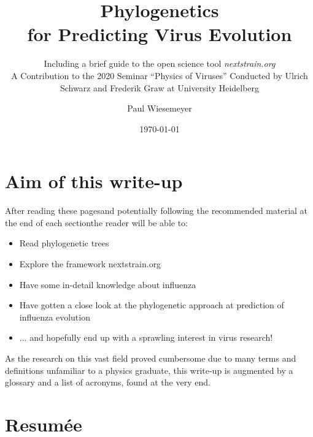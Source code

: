 \documentclass[12pt]{scrartcl}
\author{Paul Wiesemeyer}
\title{Phylogenetics\texorpdfstring{\\}{,} for Predicting Virus Evolution}
\subtitle{Including a brief guide to the open science tool {\LARGE\textit{nextstrain.org}} \texorpdfstring{\\[1cm]}{,}A Contribution to the 2020 Seminar ``Physics of Viruses'' Conducted by Ulrich Schwarz and Frederik Graw at University Heidelberg }
\date{\today}
\begin{document}
\maketitle

\clearpage

\section*{Aim of this write-up}

  After reading these pages\textemdash and potentially following the recommended material at the end of each section\textemdash the reader will be able to:
  \begin{itemize}
    \item Read phylogenetic trees
    \item Explore the framework nextstrain.org
    \item Have some in-detail knowledge about influenza
    \item Have gotten a close look at the phylogenetic approach at prediction of influenza evolution
    \item ... and hopefully end up with a sprawling interest in virus research!
  \end{itemize}

  As the research on this vast field proved cumbersome due to many terms and definitions unfamiliar to a physics graduate, this write-up is augmented by a glossary and a list of acronyms, found at the very end.

\vfill

\tableofcontents

\clearpage

\section{Resumée}
\end{document}
